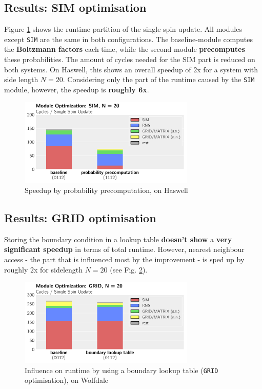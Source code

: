 \documentclass[letterpaper]{article}
\begin{document}
\subsection{Results: SIM optimisation} \label{res:SIM}
Figure \ref{SIM:Has:20} shows the runtime partition of the single spin update. All modules except \texttt{SIM} are the same in both configurations. The baseline-module computes the \textbf{Boltzmann factors} each time, while the second module \textbf{precomputes} these probabilities. The amount of cycles needed for the SIM part is reduced on both systems. On Haswell, this shows an overall speedup of $2$x for a system with side length $N = 20$. Considering only the part of the runtime caused by the \texttt{SIM} module, however, the speedup is \textbf{roughly $\mathbf{6}$x}.
	\begin{figure}[h]\centering
	  \includegraphics[width = 8.36cm]{plots/dg_20_2.pdf}
	  \caption{Speedup by probability precomputation, on Haswell}
	  \label{SIM:Has:20}
	\end{figure}
\subsection{Results: GRID optimisation}
Storing the boundary condition in a lookup table \textbf{doesn't show} a \textbf{very significant speedup} in terms of total runtime. However, nearest neighbour access - the part that is influenced most by the improvement - is sped up by roughly $2$x for sidelength $N = 20$ (see Fig. \ref{GRID:Wolf:20}).
	\begin{figure}[h]\centering
	  \includegraphics[width = 8.36cm]{plots/msk_20_1.pdf}
	  \caption{Influence on runtime by using a boundary lookup table (\texttt{GRID} optimisation), on Wolfdale}
	  \label{GRID:Wolf:20}
	\end{figure}
\end{document}
